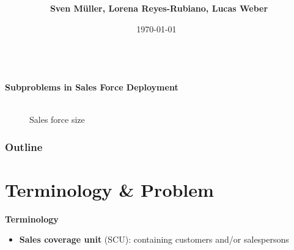 \documentclass[xcolor=dvipsnames,aspectratio=169, handout, mathserif]{beamer}
\title{ \course }
\date{\today}
\date{}
\author[Müller et al.]{\textbf{{\sffamily Sven Müller, Lorena Reyes-Rubiano, Lucas Weber }}}
\institute{{\sffamily Chair of Data \& Business Analytics\\ RWTH Aachen University}}
\date{\textcolor{white}{ff\\ff\\}}
\begin{document}
\maketitle


\begin{frame}{\textbf{Subproblems in Sales Force Deployment}}
\begin{figure}
 \begin{minipage}[b]{0.45\linewidth} \centering
  \\
	Sales force size 
 \end{minipage}
	\vspace{0.1cm}
\end{figure}
\end{frame}


\begin{frame}
	\frametitle{\textbf{Outline}}
	\tableofcontents
	\end{frame}

\section{Terminology \& Problem}

\begin{frame}{\textbf{Terminology}}
\begin{itemize}
	\item \textbf{Sales coverage unit} (SCU): containing customers and/or salespersons


\end{itemize}
\end{frame}
\end{document}
